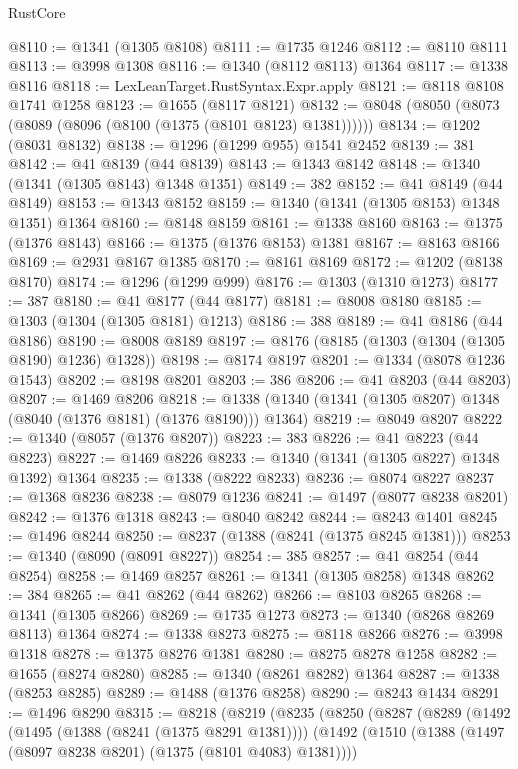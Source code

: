 \begin{lexlean}{RustCore}
\begin{coremodule}
@8110 := @1341 (@1305 @8108)
@8111 := @1735 @1246
@8112 := @8110 @8111
@8113 := @3998 @1308
@8116 := @1340 (@8112 @8113) @1364
@8117 := @1338 @8116
@8118 := LexLeanTarget.RustSyntax.Expr.apply
@8121 := @8118 @8108 @1741 @1258
@8123 := @1655 (@8117 @8121)
@8132 := @8048 (@8050 (@8073 (@8089 (@8096 (@8100 (@1375 (@8101 @8123) @1381))))))
@8134 := @1202 (@8031 @8132)
@8138 := @1296 (@1299 @955) @1541 @2452
@8139 := 381
@8142 := @41 @8139 (@44 @8139)
@8143 := @1343 @8142
@8148 := @1340 (@1341 (@1305 @8143) @1348 @1351)
@8149 := 382
@8152 := @41 @8149 (@44 @8149)
@8153 := @1343 @8152
@8159 := @1340 (@1341 (@1305 @8153) @1348 @1351) @1364
@8160 := @8148 @8159
@8161 := @1338 @8160
@8163 := @1375 (@1376 @8143)
@8166 := @1375 (@1376 @8153) @1381
@8167 := @8163 @8166
@8169 := @2931 @8167 @1385
@8170 := @8161 @8169
@8172 := @1202 (@8138 @8170)
@8174 := @1296 (@1299 @999)
@8176 := @1303 (@1310 @1273)
@8177 := 387
@8180 := @41 @8177 (@44 @8177)
@8181 := @8008 @8180
@8185 := @1303 (@1304 (@1305 @8181) @1213)
@8186 := 388
@8189 := @41 @8186 (@44 @8186)
@8190 := @8008 @8189
@8197 := @8176 (@8185 (@1303 (@1304 (@1305 @8190) @1236) @1328))
@8198 := @8174 @8197
@8201 := @1334 (@8078 @1236 @1543)
@8202 := @8198 @8201
@8203 := 386
@8206 := @41 @8203 (@44 @8203)
@8207 := @1469 @8206
@8218 := @1338 (@1340 (@1341 (@1305 @8207) @1348 (@8040 (@1376 @8181) (@1376 @8190))) @1364)
@8219 := @8049 @8207
@8222 := @1340 (@8057 (@1376 @8207))
@8223 := 383
@8226 := @41 @8223 (@44 @8223)
@8227 := @1469 @8226
@8233 := @1340 (@1341 (@1305 @8227) @1348 @1392) @1364
@8235 := @1338 (@8222 @8233)
@8236 := @8074 @8227
@8237 := @1368 @8236
@8238 := @8079 @1236
@8241 := @1497 (@8077 @8238 @8201)
@8242 := @1376 @1318
@8243 := @8040 @8242
@8244 := @8243 @1401
@8245 := @1496 @8244
@8250 := @8237 (@1388 (@8241 (@1375 @8245 @1381)))
@8253 := @1340 (@8090 (@8091 @8227))
@8254 := 385
@8257 := @41 @8254 (@44 @8254)
@8258 := @1469 @8257
@8261 := @1341 (@1305 @8258) @1348
@8262 := 384
@8265 := @41 @8262 (@44 @8262)
@8266 := @8103 @8265
@8268 := @1341 (@1305 @8266)
@8269 := @1735 @1273
@8273 := @1340 (@8268 @8269 @8113) @1364
@8274 := @1338 @8273
@8275 := @8118 @8266
@8276 := @3998 @1318
@8278 := @1375 @8276 @1381
@8280 := @8275 @8278 @1258
@8282 := @1655 (@8274 @8280)
@8285 := @1340 (@8261 @8282) @1364
@8287 := @1338 (@8253 @8285)
@8289 := @1488 (@1376 @8258)
@8290 := @8243 @1434
@8291 := @1496 @8290
@8315 := @8218
    (@8219
      (@8235
        (@8250
          (@8287
            (@8289
              (@1492
                (@1495 (@1388 (@8241 (@1375 @8291 @1381))))
                (@1492
                  (@1510 (@1388 (@1497 (@8097 @8238 @8201) (@1375 (@8101 @4083) @1381))))

\end{coremodule}
\end{lexlean}
